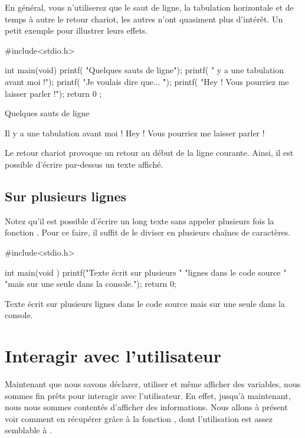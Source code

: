 En général, vous n'utiliserez que le saut de ligne, la tabulation
horizontale et de temps à autre le retour chariot, les autres n'ont
quasiment plus d'intérêt. Un petit exemple pour illustrer leurs effets.


\begin{C}
#include<stdio.h>

int main(void)
{
     printf( "Quelques sauts de ligne\n\n\n");
     printf( " \tIl y a une tabulation avant moi !\n");
     printf( "Je voulais dire que... \r ");
     printf( "Hey ! Vous pourriez me laisser parler !\n");
    return 0 ;
}
\end{C}


\begin{C}
Quelques sauts de ligne


        Il y a une tabulation avant moi !
Hey ! Vous pourriez me laisser parler !
\end{C}

\begin{infobox}
Le retour chariot provoque un retour
au début de la ligne courante. Ainsi, il est possible d'écrire
par-dessus un texte affiché.
\end{infobox}

\subsection{Sur plusieurs lignes}\label{sur-plusieurs-lignes}

Notez qu'il est possible d'écrire un long texte sans appeler plusieurs
fois la fonction . Pour ce faire, il suffit de le
diviser en plusieurs chaînes de caractères.


\begin{C}
#include<stdio.h>

int main(void )
{
     printf("Texte écrit sur plusieurs "
	    "lignes dans le code source "
	    "mais sur une seule dans la console.\n");
    return 0;
}
\end{C}


\begin{C}
Texte écrit sur plusieurs lignes dans le code source mais sur une seule dans la console.
\end{C}

\section{Interagir avec l'utilisateur }
Maintenant que nous savons déclarer, utiliser et même
afficher des variables, nous sommes fin prêts pour interagir avec
l'utilisateur.
En effet, jusqu'à maintenant, nous nous sommes contentés
d'afficher des informations. Nous allons à présent voir comment en
récupérer grâce à la fonction , dont l'utilisation est
assez semblable à .


